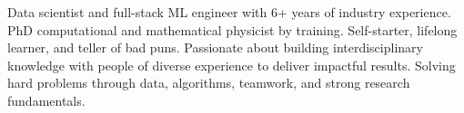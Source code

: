 

\begin{cvparagraph}

Data scientist and full-stack ML engineer with 6+ years of industry experience. 
PhD computational and mathematical physicist by training. Self-starter, lifelong learner, and teller of bad puns. 
Passionate about building interdisciplinary knowledge with people of diverse experience to deliver impactful results. 
Solving hard problems through data, algorithms, teamwork, and strong research fundamentals.
\end{cvparagraph}